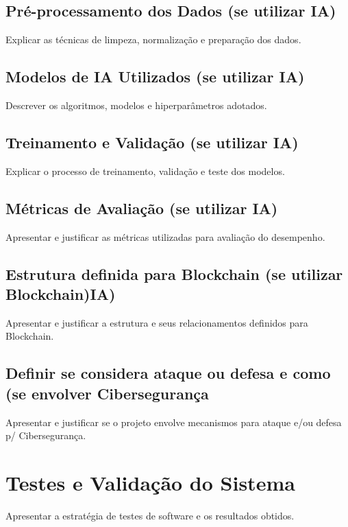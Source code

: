 \documentclass[
    12pt,           %
    oneside,        %
    a4paper,        %
    chapter=TITLE,  %
    english,        %
    brazil          %
]{abntex2}
\begin{document}
\section{Pré-processamento dos Dados (se utilizar IA)}
Explicar as técnicas de limpeza, normalização e preparação dos dados.

\section{Modelos de IA Utilizados (se utilizar IA)}
Descrever os algoritmos, modelos e hiperparâmetros adotados.

\section{Treinamento e Validação (se utilizar IA)}
Explicar o processo de treinamento, validação e teste dos modelos.

\section{Métricas de Avaliação (se utilizar IA)}
Apresentar e justificar as métricas utilizadas para avaliação do desempenho.

\section{Estrutura definida para Blockchain (se utilizar Blockchain)IA)}
Apresentar e justificar a estrutura e seus relacionamentos definidos para Blockchain.

\section{Definir se considera ataque ou defesa e como (se envolver
Cibersegurança}
Apresentar e justificar se o projeto envolve mecanismos para ataque e/ou defesa p/
Cibersegurança.


\chapter{Testes e Validação do Sistema}

Apresentar a estratégia de testes de software e os resultados obtidos.

\end{document}
